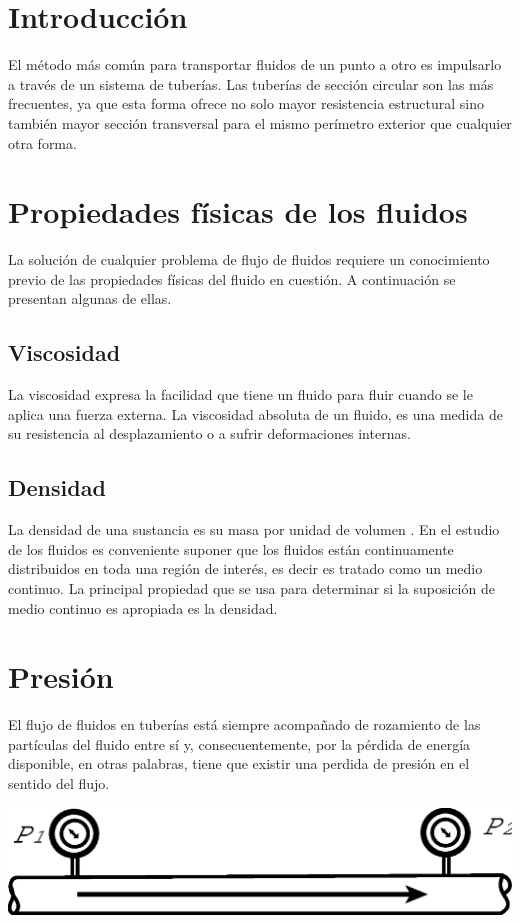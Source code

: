 \documentclass[11pt,letterpaper]{article}
\begin{document}
	\section{Introducción}
	
	El método más común para transportar fluidos de un punto a otro es impulsarlo a través de un sistema de tuberías. Las tuberías de sección circular son las más frecuentes, ya que esta forma ofrece no solo mayor resistencia estructural sino también mayor sección transversal para el mismo perímetro exterior que cualquier otra forma. \parencite[1.1]{crane}
	
	\section{Propiedades físicas de los fluidos}
	
	La solución de cualquier problema de flujo de fluidos requiere un conocimiento previo de las propiedades físicas del fluido en cuestión. A continuación se presentan algunas de ellas.
	
	\subsection{Viscosidad}
	
	La viscosidad expresa la facilidad que tiene un fluido para fluir cuando se le aplica una fuerza externa. La viscosidad absoluta de un fluido, es una medida de su resistencia al desplazamiento o  a sufrir deformaciones internas. \parencite[1.2]{crane}
	
	\subsection{Densidad}
	
	La densidad de una sustancia es su masa por unidad de volumen \parencite{crane}. En el estudio de los fluidos es conveniente suponer que los fluidos están continuamente distribuidos en toda una región de interés, es decir es tratado como un medio continuo. La principal propiedad que se usa para determinar si la suposición de medio continuo es apropiada es la densidad.\parencite[10]{merle}
	
	\section{Presión}
	
	El flujo de fluidos en tuberías está siempre acompañado de rozamiento de las partículas del fluido entre sí y, consecuentemente, por la pérdida de energía disponible, en otras palabras, tiene que existir una perdida de presión en el sentido del flujo. \parencite[1.7]{crane}
	
	\begin{center}
		\includegraphics[width=0.6\linewidth]{Vectores/Tuberia_manometros}
	\end{center}
	
	\printbibliography[title={Referencias}]
	
\end{document}
